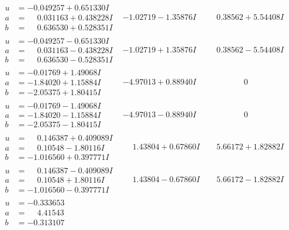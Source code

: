 \documentclass[1p]{elsarticle_modified}
\theoremstyle{definition}
\begin{document}
$$\begin{array}{c|c|c}
\begin{aligned}
u &= -0.049257 + 0.651330 I \\
a &= \phantom{-}0.031163 + 0.438228 I \\
b &= \phantom{-}0.636530 + 0.528351 I\end{aligned}
 & -1.02719 - 1.35876 I & \phantom{-}0.38562 + 5.54408 I \\ \hline\begin{aligned}
u &= -0.049257 - 0.651330 I \\
a &= \phantom{-}0.031163 - 0.438228 I \\
b &= \phantom{-}0.636530 - 0.528351 I\end{aligned}
 & -1.02719 + 1.35876 I & \phantom{-}0.38562 - 5.54408 I \\ \hline\begin{aligned}
u &= -0.01769 + 1.49068 I \\
a &= -1.84020 + 1.15884 I \\
b &= -2.05375 + 1.80415 I\end{aligned}
 & -4.97013 + 0.88940 I & \phantom{-0.000000 } 0 \\ \hline\begin{aligned}
u &= -0.01769 - 1.49068 I \\
a &= -1.84020 - 1.15884 I \\
b &= -2.05375 - 1.80415 I\end{aligned}
 & -4.97013 - 0.88940 I & \phantom{-0.000000 } 0 \\ \hline\begin{aligned}
u &= \phantom{-}0.146387 + 0.409089 I \\
a &= \phantom{-}0.10548 - 1.80116 I \\
b &= -1.016560 + 0.397771 I\end{aligned}
 & \phantom{-}1.43804 + 0.67860 I & \phantom{-}5.66172 + 1.82882 I \\ \hline\begin{aligned}
u &= \phantom{-}0.146387 - 0.409089 I \\
a &= \phantom{-}0.10548 + 1.80116 I \\
b &= -1.016560 - 0.397771 I\end{aligned}
 & \phantom{-}1.43804 - 0.67860 I & \phantom{-}5.66172 - 1.82882 I \\ \hline\begin{aligned}
u &= -0.333653\phantom{ +0.000000I} \\
a &= \phantom{-}4.41543\phantom{ +0.000000I} \\
b &= -0.313107\phantom{ +0.000000I}\end{aligned}

\end{array}$$
\end{document}
